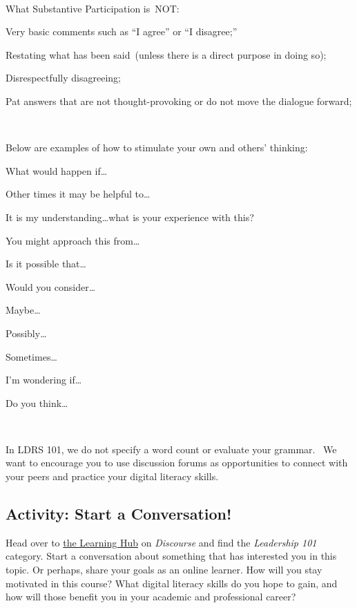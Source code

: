 \documentclass[
]{book}
\theoremstyle{definition}
\theoremstyle{definition}
\theoremstyle{definition}
\theoremstyle{definition}
\theoremstyle{remark}
\begin{document}
~

What Substantive Participation is~NOT:

Very basic comments such as ``I agree'' or ``I disagree;''

Restating what has been said~(unless there is a direct purpose in doing so);

Disrespectfully disagreeing;

Pat answers that are not thought-provoking or do not move the dialogue forward;

~

Below are examples of how to stimulate your own and others' thinking:

What would happen if\ldots{}

Other times it may be helpful to\ldots{}

It is my understanding\ldots what is your experience with this?

You might approach this from\ldots{}

Is it possible that\ldots{}

Would you consider\ldots{}

Maybe\ldots{}

Possibly\ldots{}

Sometimes\ldots{}

I'm wondering if\ldots{}

Do you think\ldots{}

{~}

In LDRS 101, we do not specify a word count or evaluate your grammar.~ We want to encourage you to use discussion forums as opportunities to connect with your peers and practice your digital literacy skills.

\hypertarget{activity-start-a-conversation}{%
\subsection*{Activity: Start a Conversation!}\label{activity-start-a-conversation}}

\begin{reflect}
Head over to \href{https://twu.discourse.group}{the Learning Hub} on \emph{Discourse} and find the \emph{Leadership 101} category. Start a conversation about something that has interested you in this topic. Or perhaps, share your goals as an online learner. How will you stay motivated in this course? What digital literacy skills do you hope to gain, and how will those benefit you in your academic and professional career?
\end{reflect}
\end{document}
